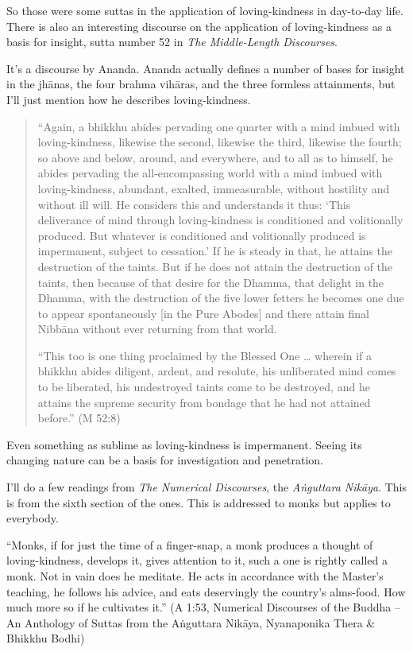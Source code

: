 So those were some suttas in the application of loving-kindness in
day-to-day life. There is also an interesting discourse on the
application of loving-kindness as a basis for insight, sutta number 52
in \emph{The Middle-Length Discourses}.

It’s a discourse by Ananda. Ananda actually defines a number of bases
for insight in the jhānas, the four brahma vihāras, and the three
formless attainments, but I’ll just mention how he describes
loving-kindness.

\begin{quotation}
“Again, a bhikkhu abides pervading one quarter with a mind imbued with
loving-kindness, likewise the second, likewise the third, likewise the
fourth; so above and below, around, and everywhere, and to all as to
himself, he abides pervading the all-encompassing world with a mind
imbued with loving-kindness, abundant, exalted, immeasurable, without
hostility and without ill will. He considers this and understands it
thus: ‘This deliverance of mind through loving-kindness is conditioned
and volitionally produced. But whatever is conditioned and volitionally
produced is impermanent, subject to cessation.’ If he is steady in that,
he attains the destruction of the taints. But if he does not attain the
destruction of the taints, then because of that desire for the Dhamma,
that delight in the Dhamma, with the destruction of the five lower
fetters he becomes one due to appear spontaneously {[}in the Pure
Abodes{]} and there attain final Nibbāna without ever returning from
that world.

“This too is one thing proclaimed by the Blessed One \ldots{} wherein if a
bhikkhu abides diligent, ardent, and resolute, his unliberated mind
comes to be liberated, his undestroyed taints come to be destroyed, and
he attains the supreme security from bondage that he had not attained
before.” (M 52:8)
\end{quotation}

Even something as sublime as loving-kindness is impermanent. Seeing its
changing nature can be a basis for investigation and penetration.

I’ll do a few readings from \emph{The Numerical Discourses}, the
\emph{Aṅguttara Nikāya}. This is from the sixth section of the ones.
This is addressed to monks but applies to everybody.

“Monks, if for just the time of a finger-snap, a monk produces a thought
of loving-kindness, develops it, gives attention to it, such a one is
rightly called a monk. Not in vain does he meditate. He acts in
accordance with the Master's teaching, he follows his advice, and eats
deservingly the country’s alms-food. How much more so if he cultivates
it.” (A 1:53, Numerical Discourses of the Buddha – An Anthology of
Suttas from the Aṅguttara Nikāya, Nyanaponika Thera \& Bhikkhu Bodhi)

